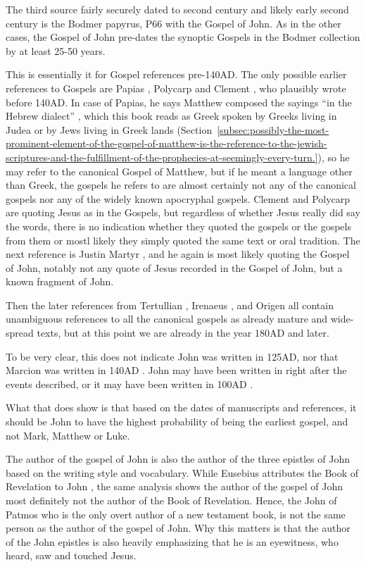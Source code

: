 The third source fairly securely dated to second century and likely early second century is the Bodmer papyrus, P66 with the Gospel of John.
As in the other cases, the Gospel of John pre-dates the synoptic Gospels in the Bodmer collection by at least 25-50 years.

This is essentially it for Gospel references pre-140AD.
The only possible earlier references to Gospels are Papias \cite[3.39]{eusebius:he}, Polycarp \cite{polycarp:philippians} and Clement \cite{clement:firstclement}, who plausibly wrote before 140AD.
In case of Papias, he says Matthew composed the sayings ``in the Hebrew dialect'' \cite[3.39]{eusebius:he}, which this book reads as Greek spoken by Greeks living in Judea or by Jews living in Greek lands (Section~\ref{subsec:possibly-the-most-prominent-element-of-the-gospel-of-matthew-is-the-reference-to-the-jewish-scriptures-and-the-fulfillment-of-the-prophecies-at-seemingly-every-turn.}), so he may refer to the canonical Gospel of Matthew, but if he meant a language other than Greek, the gospels he refers to are almost certainly not any of the canonical gospels nor any of the widely known apocryphal gospels.
Clement and Polycarp are quoting Jesus as in the Gospels, but regardless of whether Jesus really did say the words, there is no indication whether they quoted the gospels or the gospels from them or mostl likely they simply quoted the same text or oral tradition.
The next reference is Justin Martyr \cite{justinmartyr:trypho}, and he again is most likely quoting the Gospel of John, notably not any quote of Jesus recorded in the Gospel of John, but a known fragment of John.

Then the later references from Tertullian \cite{tertullian:marcionem}, Irenaeus \cite{irenaeus:advhaer}, and Origen \cite{origen:contracels} all contain unambiguous references to all the canonical gospels as already mature and wide-spread texts, but at this point we are already in the year 180AD and later.

To be very clear, this does not indicate John was written in 125AD, nor that Marcion was written in 140AD .
John may have been written in right after the events described, or it may have been written in 100AD .

What that does show is that based on the dates of manuscripts and references, it should be John to have the highest probability of being the earliest gospel, and not Mark, Matthew or Luke.

The author of the gospel of John is also the author of the three epistles of John based on the writing style and vocabulary.
While Eusebius attributes the Book of Revelation to John \cite[3.39]{eusebius:he}, the same analysis shows the author of the gospel of John most definitely not the author of the Book of Revelation.
Hence, the John of Patmos who is the only overt author of a new testament book, is not the same person as the author of the gospel of John.
Why this matters is that the author of the John epistles is also heavily emphasizing that he is an eyewitness, who heard, saw and touched Jesus.

